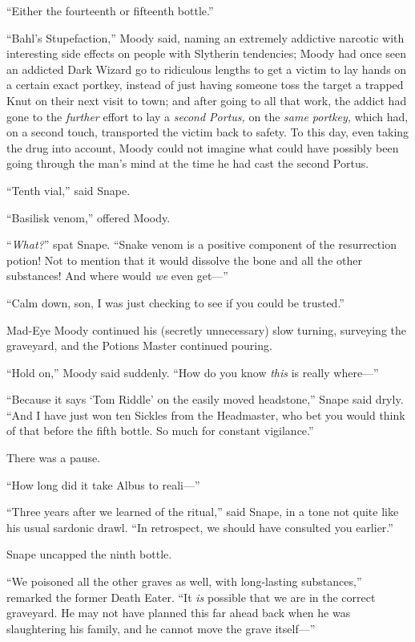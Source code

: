 “Either the fourteenth or fifteenth bottle.”

“Bahl’s Stupefaction,” Moody said, naming an extremely addictive narcotic with interesting side effects on people with Slytherin tendencies; Moody had once seen an addicted Dark Wizard go to ridiculous lengths to get a victim to lay hands on a certain exact portkey, instead of just having someone toss the target a trapped Knut on their next visit to town; and after going to all that work, the addict had gone to the \emph{further} effort to lay a \emph{second Portus,} on the \emph{same portkey,} which had, on a second touch, transported the victim back to safety. To this day, even taking the drug into account, Moody could not imagine what could have possibly been going through the man’s mind at the time he had cast the second Portus.

“Tenth vial,” said Snape.

“Basilisk venom,” offered Moody.

“\emph{What?}” spat Snape. “Snake venom is a positive component of the resurrection potion! Not to mention that it would dissolve the bone and all the other substances! And where would \emph{we} even get—”

“Calm down, son, I was just checking to see if you could be trusted.”

Mad-Eye Moody continued his (secretly unnecessary) slow turning, surveying the graveyard, and the Potions Master continued pouring.

“Hold on,” Moody said suddenly. “How do you know \emph{this} is really where—”

“Because it says ‘Tom Riddle’ on the easily moved headstone,” Snape said dryly. “And I have just won ten Sickles from the Headmaster, who bet you would think of that before the fifth bottle. So much for constant vigilance.”

There was a pause.

“How long did it take Albus to reali—”

“Three years after we learned of the ritual,” said Snape, in a tone not quite like his usual sardonic drawl. “In retrospect, we should have consulted you earlier.”

Snape uncapped the ninth bottle.

“We poisoned all the other graves as well, with long-lasting substances,” remarked the former Death Eater. “It \emph{is} possible that we are in the correct graveyard. He may not have planned this far ahead back when he was slaughtering his family, and he cannot move the grave itself—”

